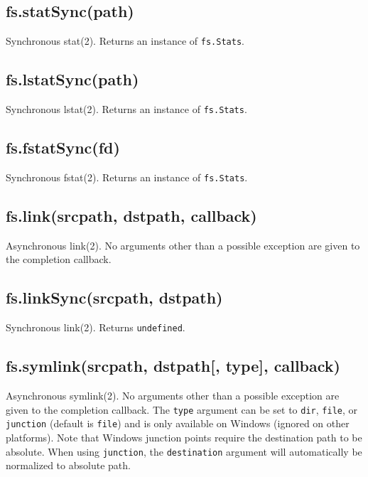 \subsection{fs.statSync(path)}\label{fs.statsyncpath}

Synchronous stat(2). Returns an instance of \texttt{fs.Stats}.

\subsection{fs.lstatSync(path)}\label{fs.lstatsyncpath}

Synchronous lstat(2). Returns an instance of \texttt{fs.Stats}.

\subsection{fs.fstatSync(fd)}\label{fs.fstatsyncfd}

Synchronous fstat(2). Returns an instance of \texttt{fs.Stats}.

\subsection{fs.link(srcpath, dstpath,
callback)}\label{fs.linksrcpath-dstpath-callback}

Asynchronous link(2). No arguments other than a possible exception are
given to the completion callback.

\subsection{fs.linkSync(srcpath,
dstpath)}\label{fs.linksyncsrcpath-dstpath}

Synchronous link(2). Returns \texttt{undefined}.

\subsection{fs.symlink(srcpath, dstpath{[}, type{]},
callback)}\label{fs.symlinksrcpath-dstpath-type-callback}

Asynchronous symlink(2). No arguments other than a possible exception
are given to the completion callback. The \texttt{type} argument can be
set to \texttt{\textquotesingle{}dir\textquotesingle{}},
\texttt{\textquotesingle{}file\textquotesingle{}}, or
\texttt{\textquotesingle{}junction\textquotesingle{}} (default is
\texttt{\textquotesingle{}file\textquotesingle{}}) and is only available
on Windows (ignored on other platforms). Note that Windows junction
points require the destination path to be absolute. When using
\texttt{\textquotesingle{}junction\textquotesingle{}}, the
\texttt{destination} argument will automatically be normalized to
absolute path.

